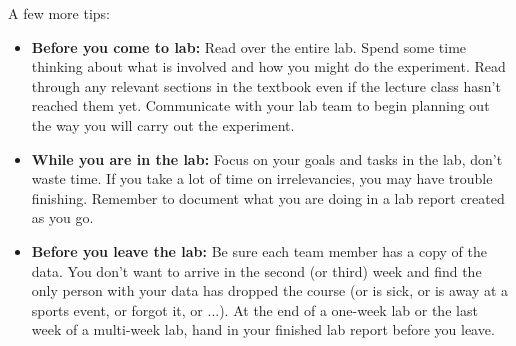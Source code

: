 \par
A few more tips:
\begin{itemize}
\setlength\itemsep{2pt}
\item \textbf{Before you come to lab:} Read over the entire lab.
Spend some time thinking about what is involved and how you might do the experiment. Read through any relevant sections in the textbook even if the lecture class hasn't reached them yet. Communicate with your lab team to begin planning out the way you will carry out the experiment.
\item \textbf{While you are in the lab:} Focus on your goals and tasks in the lab, don't waste time. If you take a lot of time on irrelevancies, you may have trouble finishing. Remember to document what you are doing in a lab report created as you go.
\item \textbf{Before you leave the lab:} Be sure each team member has a copy of the data. You don't want to arrive in the second (or third) week and find the only person with your data has dropped the course (or is sick, or is away at a sports event, or forgot it, or ...). At the end of a one-week lab or the last week of a multi-week lab, hand in your finished lab report before you leave.
\end{itemize}

